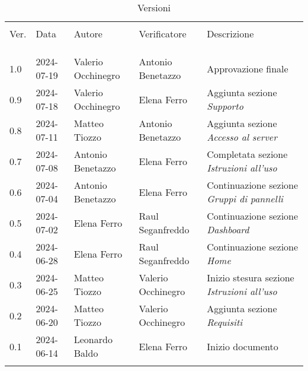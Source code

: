 \documentclass[italian,12pt]{article}
\begin{document}

\newpage


\begin{table}[!h]
    \footnotesize
    \begin{center}
        \caption*{Versioni}
        \vspace{0.5cm}
        \begin{tabular}{l l l l p{6cm}}
            \hline\\[-2ex]
            Ver. & Data       & Autore             & Verificatore       & Descrizione\\\\[-2ex] \hline \\[-1.5ex]\\
            1.0  & 2024-07-19 & Valerio Occhinegro & Antonio Benetazzo  & Approvazione finale \\
            0.9  & 2024-07-18 & Valerio Occhinegro & Elena Ferro        & Aggiunta sezione \textit{Supporto} \\
            0.8  & 2024-07-11 & Matteo Tiozzo      & Antonio Benetazzo  & Aggiunta sezione \textit{Accesso al server}\\
            0.7  & 2024-07-08 & Antonio Benetazzo  & Elena Ferro        & Completata sezione \textit{Istruzioni all'uso} \\
            0.6  & 2024-07-04 & Antonio Benetazzo  & Elena Ferro        & Continuazione sezione \textit{Gruppi di pannelli} \\
            0.5  & 2024-07-02 & Elena Ferro        & Raul Seganfreddo   & Continuazione sezione \textit{Dashboard} \\
            0.4  & 2024-06-28 & Elena Ferro        & Raul Seganfreddo   & Continuazione sezione \textit{Home} \\
            0.3  & 2024-06-25 & Matteo Tiozzo      & Valerio Occhinegro & Inizio stesura sezione \textit{Istruzioni all'uso} \\
            0.2  & 2024-06-20 & Matteo Tiozzo      & Valerio Occhinegro & Aggiunta sezione \textit{Requisiti} \\
            0.1  & 2024-06-14 & Leonardo Baldo     & Elena Ferro        & Inizio documento \\
            \\[-1.5ex] \hline
        \end{tabular}
    \end{center}
\end{table}

\newpage
\tableofcontents
\newpage
\listoffigures
\newpage




\end{document}
